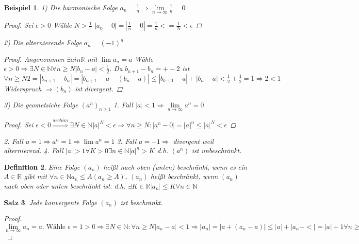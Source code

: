 \documentclass[a4paper,titlepage,oneside]{article}
\def\N{\ensuremath{\mathbb{N}} }
\def\R{\ensuremath{\mathbb{R}} }
\newcommand{\abs}[1]{\ensuremath{\left|#1\right|}}
\def\toinf{\ensuremath{\rightarrow \infty}}
\theoremstyle{thmstyle}
\newtheorem{satz}{Satz}[subsection]
\newtheorem{defi}[satz]{Definition}
\newtheorem{bsp}[satz]{Beispiel}
\begin{document}
\begin{bsp}
1) Die harmonische Folge $a_n = \frac{1}{n} \Rightarrow \lim\limits_{n \rightarrow \infty}{\frac{1}{n}} = 0$
\begin{proof}
Sei $\epsilon > 0$ Wähle $ N > \frac{1}{\epsilon}$
$\abs{a_n - 0}  = \abs{\frac{1}{n} - 0} = \frac{1}{n} <= \frac{1}{N} < \epsilon$
\end{proof}
2) Die alternierende Folge $a_n = (-1)^n$
\begin{proof}
Angenommen $\exists a in \R$ mit $ \lim{a_n} = a$ Wähle $\epsilon > 0 \Rightarrow \exists N \in  \N \forall n \ge N \abs{b_n - a} < \frac{1}{2}$. Da $b_{n+1} - b_n = +- 2$ ist $ \forall n \ge N 2 = \abs{b_{n+1} - b_{n}} = \abs{b_{n+1} - a - (b_n - a)} \le \abs{b_{b+1} - a} + \abs{b_n - a} < \frac{1}{2} + \frac{1}{2} = 1 \Rightarrow 2 < 1 $ Widerspruch $ \Rightarrow (b_n) $ ist divergent.
\end{proof}
3) Die geometsiche Folge $(a^n)_{n\ge1}$
1. Fall $|a| < 1 \Rightarrow \lim\limits_{n \toinf}a^n = 0$
\begin{proof}
Sei $\epsilon < 0 \overset{archim}{\Rightarrow} \exists N\in \N \abs{a}^N < \epsilon \Rightarrow \forall n \ge N : |a^n - 0| = |a|^n \le |a|^N < \epsilon$
\end{proof}
2. Fall $a = 1 \Rightarrow a^n = 1 \Rightarrow \lim{a^n} = 1$
3. Fall $a = -1 \Rightarrow $ divergent weil alternierend.
4. Fall $|a| > 1 \forall K > 0 \exists n \in \N |a|^n > K$ d.h. $(a^n)$ ist unbeschränkt.
\end{bsp}

\begin{defi}
Eine Folge $(a_n)$ heißt nach oben (unten) beschränkt, wenn es ein $A \in \R$ gibt mit $\forall n \in \N a_n \le A (a_n \ge A)$.
$(a_n)$ heißt beschränkt, wenn $(a_n)$  nach oben oder unten beschränkt ist. d.h. $\exists K \in \R |a_n| \le K \forall n \in \N$
\end{defi}

\begin{satz}
Jede konvergente Folge $(a_n)$ ist beschränkt.
\end{satz}
\begin{proof}
\begin{math}
\lim\limits_{n \toinf}a_n = a\text{. Wähle }\epsilon = 1 > 0 \Rightarrow \exists N \in \N : \forall n \ge N \abs{a_n - a} < 1 \Rightarrow |a_n| = |a + (a_n - a) | \le |a| + |a_n- <| = |a| + 1 \forall n \ge N\text{. Sei } K = max\{|a_1|,  |a_2|, \dots, |a_n-1|, |a|+1\} \Rightarrow |a_n| < k \forall n \ge 1 
\end{math}
\end{proof}
\end{document}
